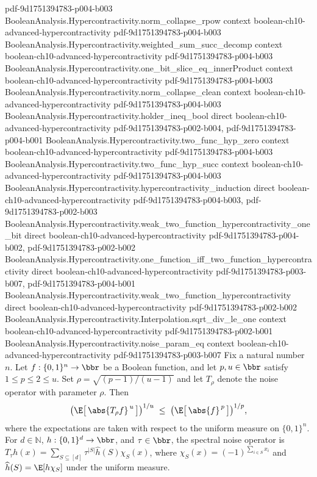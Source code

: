 \begin{theorem}
  {pdf-9d1751394783-p004-b003}
\proofstep
  {BooleanAnalysis.Hypercontractivity.norm_collapse_rpow}
  {context}
  {boolean-ch10-advanced-hypercontractivity}
  {pdf-9d1751394783-p004-b003}
\proofstep
  {BooleanAnalysis.Hypercontractivity.weighted_sum_succ_decomp}
  {context}
  {boolean-ch10-advanced-hypercontractivity}
  {pdf-9d1751394783-p004-b003}
\proofstep
  {BooleanAnalysis.Hypercontractivity.one_bit_slice_eq_innerProduct}
  {context}
  {boolean-ch10-advanced-hypercontractivity}
  {pdf-9d1751394783-p004-b003}
\proofstep
  {BooleanAnalysis.Hypercontractivity.norm_collapse_clean}
  {context}
  {boolean-ch10-advanced-hypercontractivity}
  {pdf-9d1751394783-p004-b003}
\proofstep
  {BooleanAnalysis.Hypercontractivity.holder_ineq_bool}
  {direct}
  {boolean-ch10-advanced-hypercontractivity}
  {pdf-9d1751394783-p002-b004,
    pdf-9d1751394783-p004-b001}
\proofstep
  {BooleanAnalysis.Hypercontractivity.two_func_hyp_zero}
  {context}
  {boolean-ch10-advanced-hypercontractivity}
  {pdf-9d1751394783-p004-b003}
\proofstep
  {BooleanAnalysis.Hypercontractivity.two_func_hyp_succ}
  {context}
  {boolean-ch10-advanced-hypercontractivity}
  {pdf-9d1751394783-p004-b003}
\proofstep
  {BooleanAnalysis.Hypercontractivity.hypercontractivity_induction}
  {direct}
  {boolean-ch10-advanced-hypercontractivity}
  {pdf-9d1751394783-p004-b003,
    pdf-9d1751394783-p002-b003}
\proofstep
  {BooleanAnalysis.Hypercontractivity.weak_two_function_hypercontractivity_one_bit}
  {direct}
  {boolean-ch10-advanced-hypercontractivity}
  {pdf-9d1751394783-p004-b002,
    pdf-9d1751394783-p002-b002}
\proofstep
  {BooleanAnalysis.Hypercontractivity.one_function_iff_two_function_hypercontractivity}
  {direct}
  {boolean-ch10-advanced-hypercontractivity}
  {pdf-9d1751394783-p003-b007,
    pdf-9d1751394783-p004-b001}
\proofstep
  {BooleanAnalysis.Hypercontractivity.weak_two_function_hypercontractivity}
  {direct}
  {boolean-ch10-advanced-hypercontractivity}
  {pdf-9d1751394783-p002-b002}
\proofstep
  {BooleanAnalysis.Hypercontractivity.Interpolation.sqrt_div_le_one}
  {context}
  {boolean-ch10-advanced-hypercontractivity}
  {pdf-9d1751394783-p002-b001}
\proofstep
  {BooleanAnalysis.Hypercontractivity.noise_param_eq}
  {context}
  {boolean-ch10-advanced-hypercontractivity}
  {pdf-9d1751394783-p003-b007}
Fix a natural number $n$. Let $f:\{0,1\}^n\to\bbr$ be a Boolean function, and let
$p,u\in\bbr$ satisfy $1\le p\le
2\le u$. Set $\rho=\sqrt{(p-1)/(u-1)}$ and let $T_\rho$ denote the noise operator with
parameter $\rho$. Then
\[
  \bigl(\E\bigl[\,\abs{T_\rho f}^{\,u}\,\bigr]\bigr)^{1/u}
  \;\le\;
  \bigl(\E\bigl[\,\abs{f}^{\,p}\,\bigr]\bigr)^{1/p},
\]
where the expectations are taken with respect to the uniform measure on $\{0,1\}^n$. For
$d\in\mathbb N$, $h:\{0,1\}^d\to\bbr$, and $\tau\in\bbr$, the spectral noise operator is
$T_\tau h(x)=\sum_{S\subseteq[d]}\tau^{|S|}\widehat h(S)\chi_S(x)$, where
$\chi_S(x)=(-1)^{\sum_{i\in S}x_i}$ and $\widehat h(S)=\E[h\chi_S]$ under the uniform
measure.
\end{theorem}

